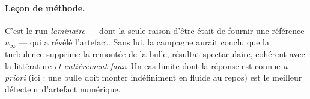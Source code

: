 \paragraph{Leçon de méthode.} C'est le run \emph{laminaire} --- dont la seule
raison d'être était de fournir une référence $u_\infty$ --- qui a révélé
l'artefact. Sans lui, la campagne aurait conclu que \og{}la turbulence supprime la
remontée de la bulle\fg{}, résultat spectaculaire, cohérent avec la littérature
\cite{legendre2025} \emph{et entièrement faux}. Un cas limite dont la réponse est
connue \emph{a priori} (ici : une bulle doit monter indéfiniment en fluide au
repos) est le meilleur détecteur d'artefact numérique.
